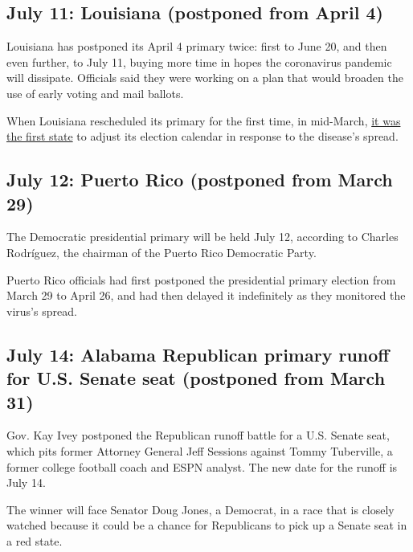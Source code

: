 \hypertarget{july-11-louisiana-postponed-from-april-4}{%
\subsection{July 11: Louisiana (postponed from April
4)}\label{july-11-louisiana-postponed-from-april-4}}

Louisiana has postponed its April 4 primary twice: first to June 20, and
then even further, to July 11, buying more time in hopes the coronavirus
pandemic will dissipate. Officials said they were working on a plan that
would broaden the use of early voting and mail ballots.

When Louisiana rescheduled its primary for the first time, in mid-March,
\href{https://www.nytimes.com/2020/03/13/us/politics/primary-voting-coronavirus.html}{it
was the first state} to adjust its election calendar in response to the
disease's spread.

\hypertarget{july-12-puerto-rico-postponed-from-march-29}{%
\subsection{July 12: Puerto Rico (postponed from March
29)}\label{july-12-puerto-rico-postponed-from-march-29}}

The Democratic presidential primary will be held July 12, according to
Charles Rodríguez, the chairman of the Puerto Rico Democratic Party.

Puerto Rico officials had first postponed the presidential primary
election from March 29 to April 26, and had then delayed it indefinitely
as they monitored the virus's spread.

\hypertarget{july-14-alabama-republican-primary-runoff-for-us-senate-seat-postponed-from-march-31}{%
\subsection{July 14: Alabama Republican primary runoff for U.S. Senate
seat (postponed from March
31)}\label{july-14-alabama-republican-primary-runoff-for-us-senate-seat-postponed-from-march-31}}

Gov. Kay Ivey postponed the Republican runoff battle for a U.S. Senate
seat, which pits former Attorney General Jeff Sessions against Tommy
Tuberville, a former college football coach and ESPN analyst. The new
date for the runoff is July 14.

The winner will face Senator Doug Jones, a Democrat, in a race that is
closely watched because it could be a chance for Republicans to pick up
a Senate seat in a red state.

